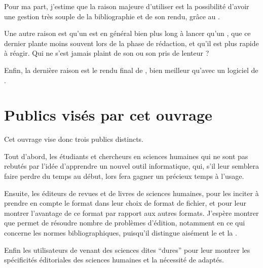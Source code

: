 Pour ma part, j'estime que la raison majeure d'utiliser \logiciel{\LaTeX} est la possibilité d'avoir une gestion très souple de la bibliographie et de son rendu, grâce au  . 

Une autre raison est qu'un  est en général bien plus long à lancer qu'un , que ce dernier plante moins souvent lors de la phase de rédaction, et qu'il est plus rapide à réagir. Qui ne s'est jamais plaint de son  ou son  pris de lenteur ?

Enfin, la dernière raison est le rendu  final de \logiciel{\LaTeX}, bien meilleur qu'avec un logiciel de .


\section{Publics visés par cet ouvrage}

Cet ouvrage vise donc trois publics distincts.

Tout d'abord, les étudiants et chercheurs en sciences humaines qui ne sont pas rebutés par l'idée d'apprendre un nouvel outil informatique, qui, s'il leur semblera faire perdre du temps au début, lors fera gagner un précieux temps à l'usage.

Ensuite, les éditeurs de revues et de livres de sciences humaines, pour les inciter à prendre en compte le format \concept{\LaTeX} dans leur choix de format de fichier, et pour leur montrer l'avantage de ce format par rapport aux autres formats. J'espère montrer que \logiciel{\LaTeX} permet de résoudre nombre de problèmes d'édition, notamment en ce qui concerne les normes bibliographiques, puisqu'il distingue aisément le  et la .

Enfin les utilisateurs de \logiciel{\LaTeX} venant des sciences dites \enquote{dures} pour leur montrer les spécificités éditoriales des sciences humaines et la nécessité de  adaptés.

